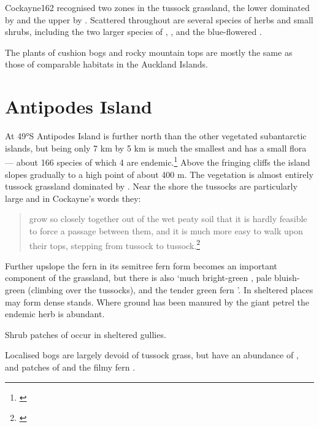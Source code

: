 Cockayne162 recognised two zones in the tussock grassland, the lower dominated by  and the upper by .
Scattered throughout are several species of herbs and small shrubs, including the two larger species of , ,  and the blue-flowered .

The plants of cushion bogs and rocky mountain tops are mostly the same as those of comparable habitats in the Auckland Islands.

\section{Antipodes Island}

At 49°S Antipodes Island is further north than the other vegetated subantarctic islands, but being only 7 km by 5 km is much the smallest and has a small flora --- about 166 species of which 4 are endemic.\footnote{\cite{williams1982species}}
Above the fringing cliffs the island slopes gradually to a high point of about 400 m.
The vegetation is almost entirely tussock grassland dominated by .
Near the shore the tussocks are particularly large and in Cockayne's words they:

\begin{quote}
	grow so closely together out of the wet peaty soil that it is hardly feasible to force a passage between them, and it is much more easy to walk upon their tops, stepping from tussock to tussock.\footnote{\cite{cockayne1909ecological}}
\end{quote}

Further upslope the fern  in its semitree fern form becomes an important component of the grassland, but there is also `much bright-green , pale bluish-green  (climbing over the tussocks), and the tender green fern '.
In sheltered places  may form dense stands.
Where ground has been manured by the giant petrel the endemic herb  is abundant.

Shrub patches of  occur in sheltered gullies.

Localised bogs are largely devoid of tussock grass, but have an abundance of ,  and patches of  and the filmy fern .

